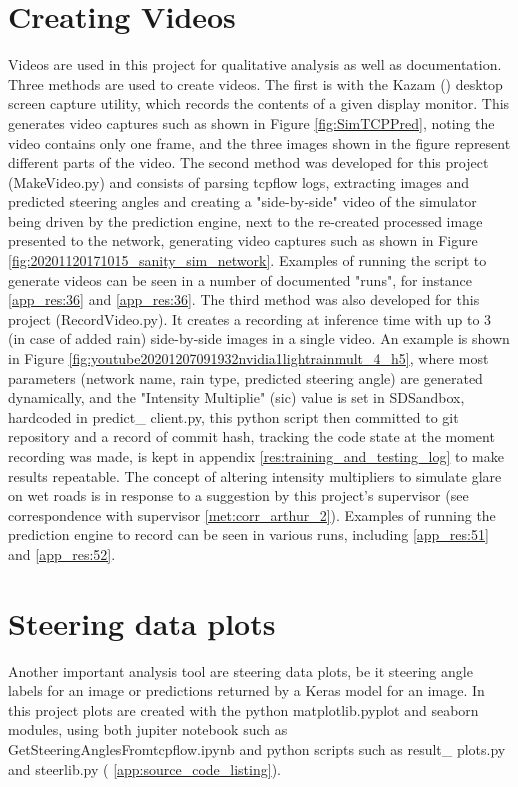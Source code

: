 \section{Creating Videos}
Videos are used in this project for qualitative analysis as well as documentation. Three methods are used to create videos. The first is with the Kazam (\cite{Kazam2020}) desktop screen capture utility, which records the contents of a given display monitor. This generates video captures such as shown in Figure \ref{fig:SimTCPPred}, noting the video contains only one frame, and the three images shown in the figure represent different parts of the video. The second method was developed for this project (MakeVideo.py) and consists of parsing tcpflow logs, extracting images and predicted steering angles and creating a "side-by-side" video of the simulator being driven by the prediction engine, next to the re-created processed image presented to the network, generating video captures such as shown in Figure  \ref{fig:20201120171015_sanity_sim_network}. Examples of running the script to generate videos can be seen in a number of documented "runs", for instance \ref{app_res:36} and \ref{app_res:36}. The third method was also developed for this project (RecordVideo.py). It creates a recording at inference time with up to 3 (in case of added rain) side-by-side images in a single video. An example is shown in Figure \ref{fig:youtube20201207091932nvidia1lightrainmult_4_h5}, where most parameters (network name, rain type, predicted steering angle) are generated dynamically, and the "Intensity Multiplie" (sic) value is set in SDSandbox, hardcoded in predict\_ client.py, this python script then committed to git repository and a record of commit hash, tracking the code state at the moment recording was made, is kept in appendix \ref{res:training_and_testing_log} to make results repeatable. The concept of altering intensity multipliers to simulate glare on wet roads is in response to a suggestion by this project's supervisor (see correspondence with supervisor \ref{met:corr_arthur_2}). Examples of running the prediction engine to record can be seen in various runs, including \ref{app_res:51} and \ref{app_res:52}.

\section{Steering data plots}
Another important analysis tool are steering data plots, be it steering angle labels for an image or predictions returned by a Keras model for an image. In this project plots are created with the python matplotlib.pyplot and seaborn modules, using both jupiter notebook such as GetSteeringAnglesFromtcpflow.ipynb and python scripts such as result\_ plots.py and steerlib.py ( \ref{app:source_code_listing}).

